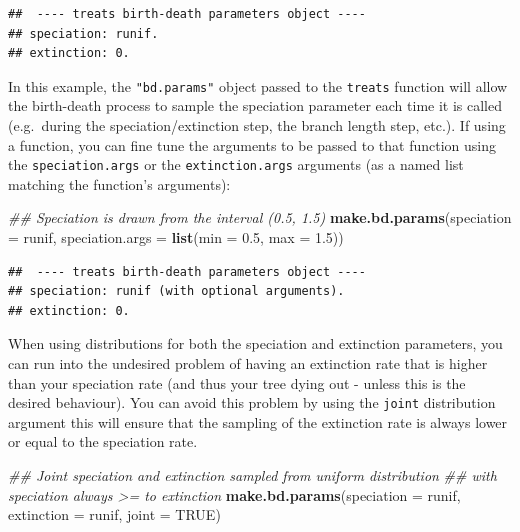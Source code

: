 \documentclass[
]{book}
\newenvironment{Shaded}{\begin{snugshade}}{\end{snugshade}}
\newcommand{\CommentTok}[1]{\textcolor[rgb]{0.56,0.35,0.01}{\textit{#1}}}
\newcommand{\DataTypeTok}[1]{\textcolor[rgb]{0.13,0.29,0.53}{#1}}
\newcommand{\FloatTok}[1]{\textcolor[rgb]{0.00,0.00,0.81}{#1}}
\newcommand{\KeywordTok}[1]{\textcolor[rgb]{0.13,0.29,0.53}{\textbf{#1}}}
\newcommand{\NormalTok}[1]{#1}
\newcommand{\OtherTok}[1]{\textcolor[rgb]{0.56,0.35,0.01}{#1}}
\begin{document}
\begin{verbatim}
##  ---- treats birth-death parameters object ---- 
## speciation: runif.
## extinction: 0.
\end{verbatim}

In this example, the \texttt{"bd.params"} object passed to the \texttt{treats} function will allow the birth-death process to sample the speciation parameter each time it is called (e.g.~during the speciation/extinction step, the branch length step, etc.).
If using a function, you can fine tune the arguments to be passed to that function using the \texttt{speciation.args} or the \texttt{extinction.args} arguments (as a named list matching the function's arguments):

\begin{Shaded}
\begin{Highlighting}[]
\CommentTok{\#\# Speciation is drawn from the interval (0.5, 1.5)}
\KeywordTok{make.bd.params}\NormalTok{(}\DataTypeTok{speciation =}\NormalTok{ runif,}
               \DataTypeTok{speciation.args =} \KeywordTok{list}\NormalTok{(}\DataTypeTok{min =} \FloatTok{0.5}\NormalTok{, }\DataTypeTok{max =} \FloatTok{1.5}\NormalTok{))}
\end{Highlighting}
\end{Shaded}

\begin{verbatim}
##  ---- treats birth-death parameters object ---- 
## speciation: runif (with optional arguments).
## extinction: 0.
\end{verbatim}

When using distributions for both the speciation and extinction parameters, you can run into the undesired problem of having an extinction rate that is higher than your speciation rate (and thus your tree dying out - unless this is the desired behaviour).
You can avoid this problem by using the \texttt{joint} distribution argument this will ensure that the sampling of the extinction rate is always lower or equal to the speciation rate.

\begin{Shaded}
\begin{Highlighting}[]
\CommentTok{\#\# Joint speciation and extinction sampled from uniform distribution }
\CommentTok{\#\# with speciation always \textgreater{}= to extinction}
\KeywordTok{make.bd.params}\NormalTok{(}\DataTypeTok{speciation =}\NormalTok{ runif, }\DataTypeTok{extinction =}\NormalTok{ runif, }\DataTypeTok{joint =} \OtherTok{TRUE}\NormalTok{)}
\end{Highlighting}
\end{Shaded}
\end{document}
